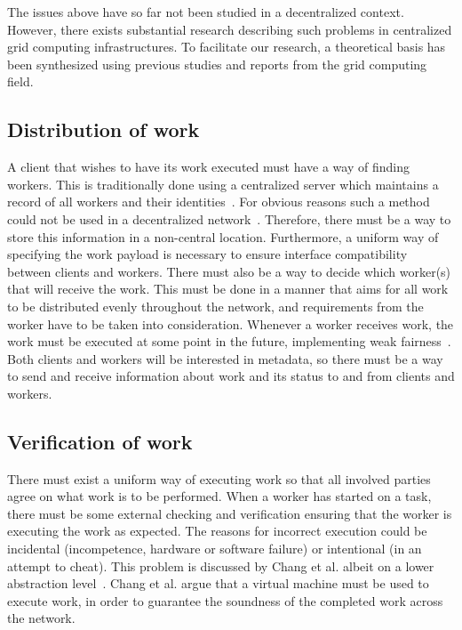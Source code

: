 The issues above have so far not been studied in a decentralized context. However, there exists substantial research describing such problems in centralized grid computing infrastructures. To facilitate our research, a theoretical basis has been synthesized using previous studies and reports from the grid computing field.

\subsection{Distribution of work}
\label{sec:prob:distribution}
A client that wishes to have its work executed must have a way of finding workers. This is traditionally done using a centralized server which maintains a record of all workers and their identities~\cite{anderson:2005}\cite{sarmenta:2002}. For obvious reasons such a method could not be used in a decentralized network~\cite{baran}. Therefore, there must be a way to store this information in a non-central location. Furthermore, a uniform way of specifying the work payload is necessary to ensure interface compatibility between clients and workers. There must also be a way to decide which worker(s) that will receive the work. This must be done in a manner that aims for all work to be distributed evenly throughout the network, and requirements from the worker have to be taken into consideration. Whenever a worker receives work, the work must be executed at some point in the future, implementing weak fairness~\cite{benari}. Both clients and workers will be interested in metadata, so there must be a way to send and receive information about work and its status to and from clients and workers.

\subsection{Verification of work}
\label{sec:prob:verification}
There must exist a uniform way of executing work so that all involved parties agree on what work is to be performed. When a worker has started on a task, there must be some external checking and verification ensuring that the worker is executing the work as expected. The reasons for incorrect execution could be incidental (incompetence, hardware or software failure) or intentional (in an attempt to cheat). This problem is discussed by Chang et al. albeit on a lower abstraction level~\cite{chang:2002}. Chang et al. argue that a virtual machine must be used to execute work, in order to guarantee the soundness of the completed work across the network.

